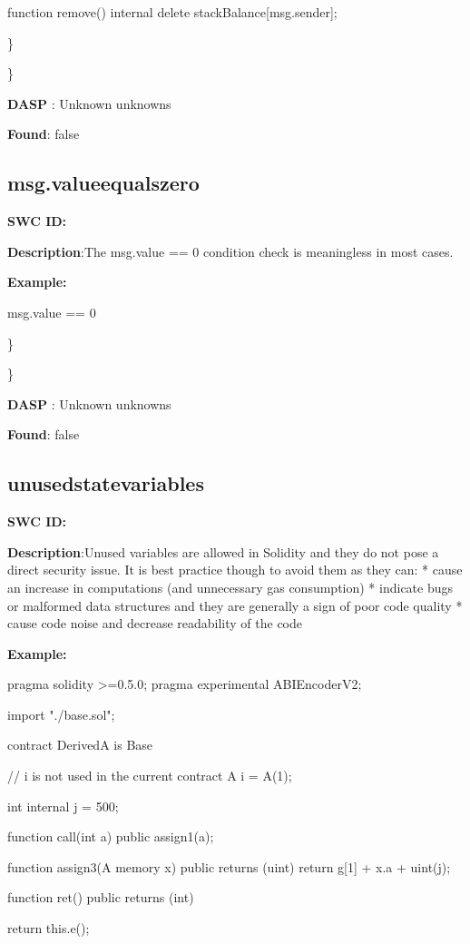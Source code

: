 \documentclass{article}
\begin{document}
{function remove() internal{
      delete stackBalance[msg.sender];
}

\} 

\} 

\textbf{DASP} : Unknown unknowns

\textbf{Found}: false

\subsection{msg.value\textunderscore equals\textunderscore zero} 
\textbf{SWC \textunderscore ID:} 

\textbf{Description}:The msg.value == 0 condition check is meaningless in most cases.


\textbf{Example:} 

msg.value == 0

\} 

\} 

\textbf{DASP} : Unknown unknowns

\textbf{Found}: false

\subsection{unused\textunderscore state\textunderscore variables} 
\textbf{SWC \textunderscore ID:} 

\textbf{Description}:Unused variables are allowed in Solidity and they do not pose a direct security issue. It is best practice though to avoid them as they can:
* cause an increase in computations (and unnecessary gas consumption)
* indicate bugs or malformed data structures and they are generally a sign of poor code quality
* cause code noise and decrease readability of the code


\textbf{Example:} 

pragma solidity >=0.5.0;
pragma experimental ABIEncoderV2;

import "./base.sol";

contract DerivedA is Base {
    // i is not used in the current contract
    A i = A(1);

    int internal j = 500;

    function call(int a) public {
        assign1(a);
    }

    function assign3(A memory x) public returns (uint) {
        return g[1] + x.a + uint(j);
    }

    function ret() public returns (int){
        return this.e();

}}}
\end{document}
